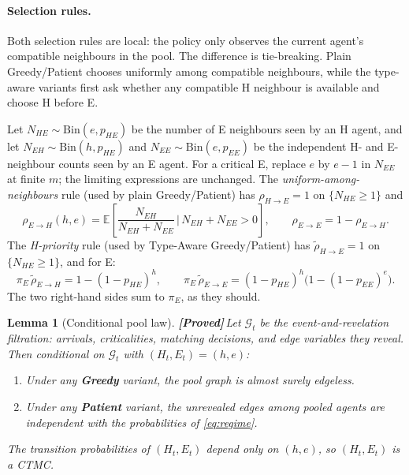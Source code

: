 \documentclass{article}
\theoremstyle{plain}
\newtheorem{lemma}{Lemma}
\theoremstyle{definition}
\newcommand{\E}{\mathbb{E}}
\newcommand{\proved}{\textcolor{provedgreen}{\textbf{[Proved]}}\,}
\begin{document}
\paragraph{Selection rules.}
Both selection rules are local: the policy only observes the current agent's compatible neighbours in the pool. The difference is tie-breaking. Plain Greedy/Patient chooses uniformly among compatible neighbours, while the type-aware variants first ask whether any compatible H neighbour is available and choose H before E.

Let $N_{HE}\sim\mathrm{Bin}(e,p_{HE})$ be the number of E neighbours seen by an H agent, and let $N_{EH}\sim\mathrm{Bin}(h,p_{HE})$ and $N_{EE}\sim\mathrm{Bin}(e,p_{EE})$ be the independent H- and E-neighbour counts seen by an E agent. For a critical E, replace $e$ by $e-1$ in $N_{EE}$ at finite $m$; the limiting expressions are unchanged. The \emph{uniform-among-neighbours} rule (used by plain Greedy/Patient) has $\rho_{H\to E}=1$ on $\{N_{HE}\ge 1\}$ and
\[
\rho_{E\to H}(h,e)=\E\!\left[\frac{N_{EH}}{N_{EH}+N_{EE}}\,\bigg|\,N_{EH}+N_{EE}>0\right],\qquad \rho_{E\to E}=1-\rho_{E\to H}.
\]
The \emph{H-priority} rule (used by Type-Aware Greedy/Patient) has $\widetilde\rho_{H\to E}=1$ on $\{N_{HE}\ge 1\}$, and for E:
\[
\pi_E\,\widetilde\rho_{E\to H}=1-(1-p_{HE})^h,\qquad \pi_E\,\widetilde\rho_{E\to E}=(1-p_{HE})^h\bigl(1-(1-p_{EE})^e\bigr).
\]
The two right-hand sides sum to $\pi_E$, as they should.

\begin{lemma}[Conditional pool law]\label{lem:pool}
\proved Let $\mathcal{G}_t$ be the event-and-revelation filtration: arrivals, criticalities, matching decisions, and edge variables they reveal. Then conditional on $\mathcal{G}_t$ with $(H_t,E_t)=(h,e)$:
\begin{enumerate}
\item Under any \textbf{Greedy} variant, the pool graph is almost surely edgeless.
\item Under any \textbf{Patient} variant, the unrevealed edges among pooled agents are independent with the probabilities of \eqref{eq:regime}.
\end{enumerate}
The transition probabilities of $(H_t,E_t)$ depend only on $(h,e)$, so $(H_t,E_t)$ is a CTMC.
\end{lemma}
\end{document}
